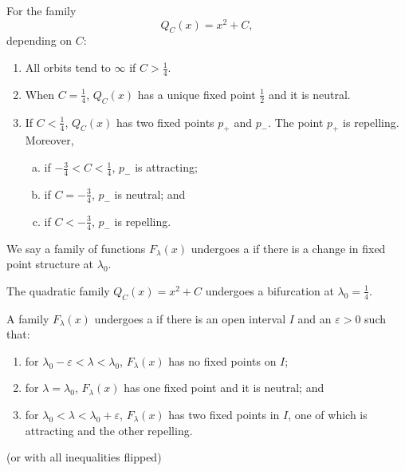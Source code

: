 \documentclass[class=pmath370,tikz,notes]{agony}
\begin{document}
\begin{theorem}
  For the family
  \[ Q_C(x) = x^2 + C, \]
  depending on $C$:
  \begin{enumerate}
    \item All orbits tend to $\infty$ if $C > \frac14$.
    \item When $C = \frac14$, $Q_C(x)$ has a unique fixed point $\frac12$ and it is neutral.
    \item If $C < \frac14$, $Q_C(x)$ has two fixed points $p_+$ and $p_-$.
          The point $p_+$ is repelling.
          Moreover,
          \begin{enumerate}[(a),nosep]
            \item if $-\frac34 < C < \frac14$, $p_-$ is attracting;
            \item if $C = -\frac34$, $p_-$ is neutral; and
            \item if $C < -\frac34$, $p_-$ is repelling.
          \end{enumerate}
  \end{enumerate}
\end{theorem}


\begin{defn}[bifurcation]
  We say a family of functions $F_\lambda(x)$ undergoes a 
  if there is a change in fixed point structure at $\lambda_0$.
\end{defn}

\begin{example}
  The quadratic family $Q_C(x) = x^2 + C$ undergoes a bifurcation at $\lambda_0 = \frac14$.
\end{example}

\begin{defn}
  A family $F_\lambda(x)$ undergoes a 
  if there is an open interval $I$ and an $\varepsilon>0$ such that:
  \begin{enumerate}[nosep]
    \item for $\lambda_0-\varepsilon<\lambda<\lambda_0$, $F_\lambda(x)$ has no fixed points on $I$;
    \item for $\lambda = \lambda_0$, $F_\lambda(x)$ has one fixed point and it is neutral; and
    \item for $\lambda_0<\lambda<\lambda_0+\varepsilon$, $F_\lambda(x)$ has two fixed points in $I$,
          one of which is attracting and the other repelling.
  \end{enumerate}
  (or with all inequalities flipped)
\end{defn}
\end{document}
